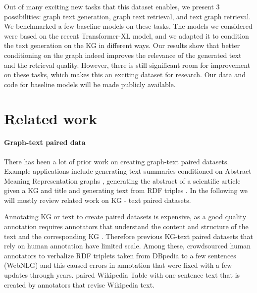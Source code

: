 \documentclass[11pt]{article}
\begin{document}
Out of many exciting new tasks that this dataset enables, we present 3 possibilities: graph  text generation, graph  text retrieval, and text  graph retrieval.  We benchmarked a few baseline models on these tasks.  The models we considered were based on the recent Transformer-XL \cite{dai2019transformer} model, and we adapted it to condition the text generation on the KG in different ways.  Our results show that better conditioning on the graph indeed improves the relevance of the generated text and the retrieval quality.  However, there is still significant room for improvement on these tasks, which makes this an exciting dataset for research.
Our data and code for baseline models will be made publicly available. 
 








\section{Related work}

\paragraph{Graph-text paired data} There has been a lot of prior work on creating graph-text paired datasets.
Example applications include generating text summaries conditioned on Abstract Meaning Representation graphs \cite{liu2018toward}, generating the abstract of a scientific article given a KG and title \cite{koncel-kedziorski-etal-2019-text} and generating text from RDF triples \cite{gardent-etal-2017-webnlg,jin-etal-2020-genwiki}.  In the following we will mostly review related work on KG - text paired datasets.

Annotating KG or text to create paired datasets is expensive, as
a good quality annotation requires annotators that understand the content and structure of the text and the corresponding KG \cite{jin-etal-2020-genwiki}.
Therefore previous KG-text paired datasets that rely on human annotation have limited scale.
Among these, \citet{gardent-etal-2017-webnlg} crowdsourced human annotators to verbalize RDF triplets taken from DBpedia \cite{DBpedia} to a few sentences (WebNLG) and this caused errors in annotation that were fixed with a few updates through years.
\citet{parikh2020totto} paired Wikipedia Table with one sentence text that is created by annotators that revise Wikipedia text.
\end{document}
